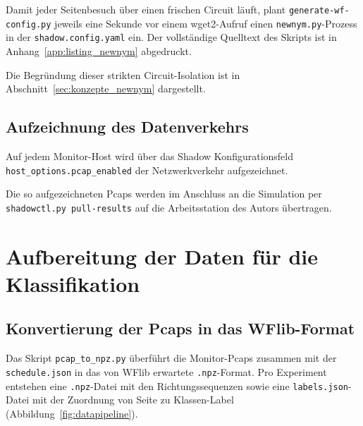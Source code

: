 Damit jeder Seitenbesuch über einen frischen Circuit läuft, plant \texttt{generate-wf-config.py} jeweils eine Sekunde vor einem wget2-Aufruf einen \texttt{newnym.py}-Prozess in der \texttt{shadow.config.yaml} ein.
Der vollständige Quelltext des Skripts ist in Anhang~\ref{app:listing_newnym} abgedruckt.

Die Begründung dieser strikten Circuit-Isolation ist in Abschnitt~\ref{sec:konzepte_newnym} dargestellt.

\subsection{Aufzeichnung des Datenverkehrs}
\label{sec:realisierung_pcap_capture}

Auf jedem Monitor-Host wird über das Shadow Konfigurationsfeld \texttt{host\_options.pcap\_enabled} der Netzwerkverkehr aufgezeichnet.

Die so aufgezeichneten Pcaps werden im Anschluss an die Simulation per \texttt{shadowctl.py pull-results} auf die Arbeitsstation des Autors übertragen.

\section{Aufbereitung der Daten für die Klassifikation}
\label{sec:realisierung_aufbereitung}

\subsection{Konvertierung der Pcaps in das WFlib-Format}
\label{sec:realisierung_pcap_to_npz}

Das Skript \texttt{pcap\_to\_npz.py} überführt die Monitor-Pcaps zusammen mit der \texttt{schedule.json} in das von WFlib erwartete \texttt{.npz}-Format.
Pro Experiment entstehen eine \texttt{.npz}-Datei mit den Richtungssequenzen sowie eine \texttt{labels.json}-Datei mit der Zuordnung von Seite zu Klassen-Label (Abbildung~\ref{fig:datapipeline}).

